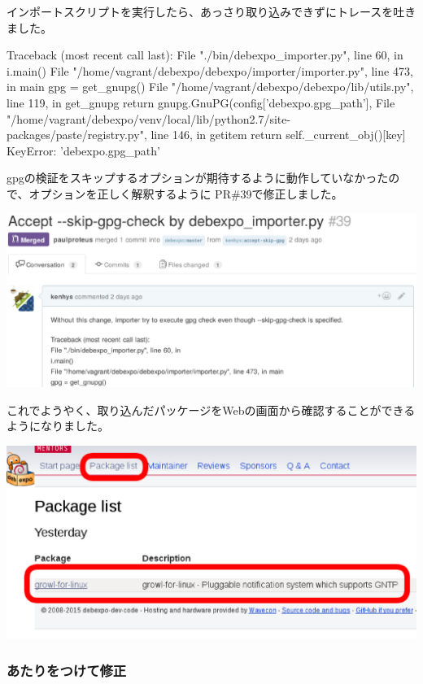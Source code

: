 \documentclass[mingoth,a4paper]{jsarticle}
\begin{document}
インポートスクリプトを実行したら、あっさり取り込みできずにトレースを吐きました。

\begin{commandline}
Traceback (most recent call last):
  File "./bin/debexpo_importer.py", line 60, in
  i.main()
  File "/home/vagrant/debexpo/debexpo/importer/importer.py", line 473, in main
  gpg = get_gnupg()
  File "/home/vagrant/debexpo/debexpo/lib/utils.py", line 119, in get_gnupg
  return gnupg.GnuPG(config['debexpo.gpg_path'],
  File "/home/vagrant/debexpo/venv/local/lib/python2.7/site-packages/paste/registry.py", line 146, in getitem
  return self._current_obj()[key]
  KeyError: 'debexpo.gpg_path'
\end{commandline}

gpgの検証をスキップするオプションが期待するように動作していなかったので、オプションを正しく解釈するように PR\#39で修正しました。

\begin{screen}
\includegraphics[width=0.7\hsize]{image201606/debexpo-pr39-skip-gpg.eps}
\end{screen}

これでようやく、取り込んだパッケージをWebの画面から確認することができるようになりました。

\begin{screen}
\includegraphics[width=0.7\hsize]{image201606/debexpo-package-list.eps}
\end{screen}

\subsubsection{あたりをつけて修正}
\end{document}
